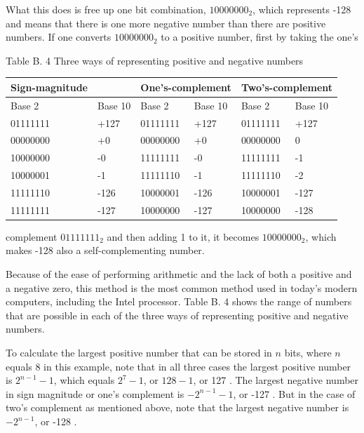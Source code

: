 \documentclass[10pt]{book}
\begin{document}
What this does is free up one bit combination, $10000000_{2}$, which represents -128 and means that there is one more negative number than there are positive numbers. If one converts $10000000_{2}$ to a positive number, first by taking the one's

Table B. 4 Three ways of representing positive and negative numbers

\begin{center}
\begin{tabular}{|l|l|l|l|l|l|}
\hline
Sign-magnitude &  & \multicolumn{2}{|l|}{One's-complement} & \multicolumn{2}{l|}{Two's-complement} \\
\hline
Base 2 & Base 10 & Base 2 & Base 10 & Base 2 & Base 10 \\
\hline
01111111 & +127 & 01111111 & +127 & 01111111 & +127 \\
\hline
00000000 & +0 & 00000000 & +0 & 00000000 & 0 \\
\hline
10000000 & -0 & 11111111 & -0 & 11111111 & -1 \\
\hline
10000001 & -1 & 11111110 & -1 & 11111110 & -2 \\
\hline
11111110 & -126 & 10000001 & -126 & 10000001 & -127 \\
\hline
11111111 & -127 & 10000000 & -127 & 10000000 & -128 \\
\hline
\end{tabular}
\end{center}

complement $01111111_{2}$ and then adding 1 to it, it becomes $10000000_{2}$, which makes -128 also a self-complementing number.

Because of the ease of performing arithmetic and the lack of both a positive and a negative zero, this method is the most common method used in today's modern computers, including the Intel processor. Table B. 4 shows the range of numbers that are possible in each of the three ways of representing positive and negative numbers.

To calculate the largest positive number that can be stored in $n$ bits, where $n$ equals 8 in this example, note that in all three cases the largest positive number is $2^{n-1}-1$, which equals $2^{7}-1$, or $128-1$, or 127 . The largest negative number in sign magnitude or one's complement is $-2^{n-1}-1$, or -127 . But in the case of two's complement as mentioned above, note that the largest negative number is $-2^{n-1}$, or -128 .
\end{document}
